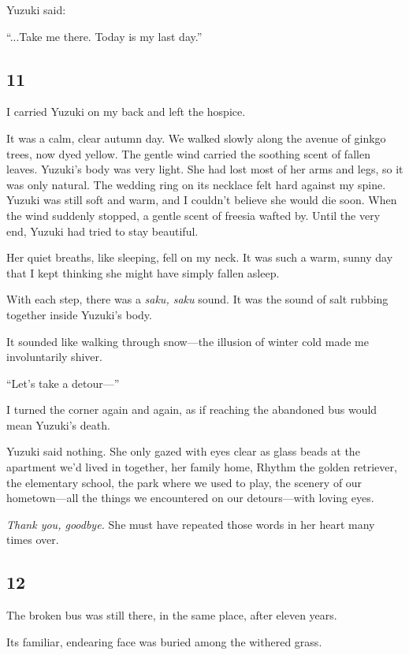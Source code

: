 \documentclass[
    a4paper,
    12pt,
    twoside,
    openany,
    UTF8,
    fontset=windows
]{ctexbook}
\begin{document}
Yuzuki said:

``...Take me there. Today is my last day.''

\subsection*{11}

I carried Yuzuki on my back and left the hospice.

It was a calm, clear autumn day. We walked slowly along the avenue of ginkgo trees, now dyed yellow. The gentle wind carried the soothing scent of fallen leaves. Yuzuki's body was very light. She had lost most of her arms and legs, so it was only natural. The wedding ring on its necklace felt hard against my spine. Yuzuki was still soft and warm, and I couldn't believe she would die soon. When the wind suddenly stopped, a gentle scent of freesia wafted by. Until the very end, Yuzuki had tried to stay beautiful.

Her quiet breaths, like sleeping, fell on my neck. It was such a warm, sunny day that I kept thinking she might have simply fallen asleep.

With each step, there was a \textit{saku, saku} sound. It was the sound of salt rubbing together inside Yuzuki's body.

It sounded like walking through snow---the illusion of winter cold made me involuntarily shiver.

``Let's take a detour---''

I turned the corner again and again, as if reaching the abandoned bus would mean Yuzuki's death.

Yuzuki said nothing. She only gazed with eyes clear as glass beads at the apartment we'd lived in together, her family home, Rhythm the golden retriever, the elementary school, the park where we used to play, the scenery of our hometown---all the things we encountered on our detours---with loving eyes.

\emph{Thank you, goodbye.} She must have repeated those words in her heart many times over.


\subsection*{12}

The broken bus was still there, in the same place, after eleven years.

Its familiar, endearing face was buried among the withered grass.
\end{document}
